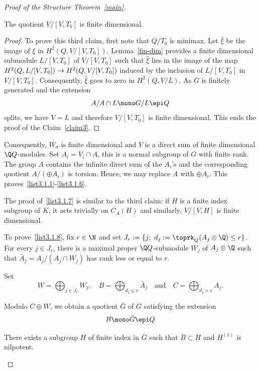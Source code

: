 \begin{proof}[{Proof of the Structure Theorem~\ref{main}}]
\begin{claiml}\label{claim3}
The quotient $V/[V, T_0]$ is finite dimensional.
\end{claiml}

\begin{proof}
To prove this third claim, first note that $Q/T_0$ is minimax. Let $\hat \xi$ be the image of $\xi$ in $H^2(Q, V/[V, T_0])$. Lemma~\ref{fin-dim} provides a finite dimensional submodule $L/[V, T_0]$ of $V/[V, T_0]$ such that $\hat \xi$ lies in the image of the map $H^2(Q, L/[V, T_0])\linebreak\rightarrow H^2(Q, V/[V, T_0])$ induced by the inclusion of $L/[V, T_0]$ in $V/[V, T_0]$. Consequently, $\hat \xi$ goes to zero in $H^2(Q, V/L)$. As $G$ is finitely generated and the extension
\[
A/A\cap L \mono G/L\epi Q
\]
splits, we have $V = L$ and therefore $V/[V, T_0]$ is finite dimensional. This ends the proof of the Claim~\ref{claim3}.
\end{proof}

Consequently, $W_\sigma$ is finite dimensional and $V$ is a direct sum of finite dimensional $\Q Q$-modules. Set $A_i = V_i \cap A$, this is a normal subgroup of $G$ with finite rank. The group $A$ contains the infinite direct sum of the $A_i$'s and the corresponding quotient $A/(\oplus A_i)$ is torsion. Hence, we may replace $A$ with $\oplus A_i$. This proves~\eqref{list3.1.1}-\eqref{list3.1.6}.


The proof of~\eqref{list3.1.7} is similar to the third claim: if $H$ is a finite index subgroup of $K$, it acts trivially on $C_A(H)$ and similarly, $V/[V, H]$ is finite dimensional.


To prove~\eqref{list3.1.8}, fix $r \in \N$ and set $J_r:=\{j;\ d_j:=\toprk_Q(A_j\otimes\Q) \leq r\}$. For every $j \in J_r$, there is a maximal proper $\Q Q$-submodule $W_j$ of $A_j\otimes
\Q$ such that $\bar A_j = A_j/(A_j \cap W_j)$ has rank less or equal to $r$.

Set
\[
W = \bigoplus_{j\in J_r} W_j,\quad B = \bigoplus_{d_j \leq r} \bar A_j\quad \text{and}\quad C = \bigoplus_{d_j > r} A_j.
\]

Modulo $C\oplus W$, we obtain a quotient $\bar G$ of $G$ satisfying the extension
\[
B \mono \bar G \epi Q
\]
\goodbreak
\begin{claiml}
There exists a subgroup $H$ of finite index in $\bar G$ such that $B \subset H$ and $H^{(1)}$ is nilpotent.
\end{claiml}



\end{proof}
